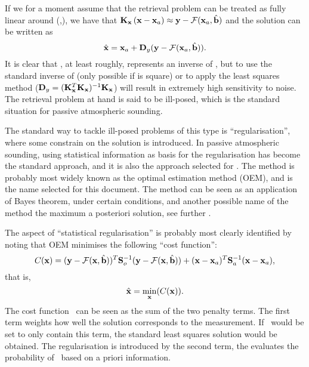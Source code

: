 If we for a moment assume that the retrieval problem can be treated as fully
linear around (,\FrwMdlVctHat), we
have that $\mathbf{K}_{\mathbf{x}}\left(\mathbf{x}-\mathbf{x}_{a}\right)\approx \mathbf{y}
-\mathcal{F}(\mathbf{x}_{a},\hat{\mathbf{b}})$ and the solution can be written as
\begin{equation}
  \label{eq:linretrieval}
  \hat{\mathbf{x}} = \mathbf{x}_{a} + \mathbf{D}_{y}(\mathbf{y}-\mathcal{F}(\mathbf{x}_{a},\hat{\mathbf{b}})).
\end{equation}
It is clear that \CtrFncMtr, at least roughly, represents an inverse of
\aWfnMtr{\SttVct}, but to use the standard inverse of \aWfnMtr{\SttVct} (only
possible if \aWfnMtr{\SttVct} is square) or to apply the least squares method
($\mathbf{D}_{y}=(\mathbf{K}_{\mathbf{x}}^T\mathbf{K}_{\mathbf{x}})^{-1}\mathbf{K}_{\mathbf{x}}$)
will result in extremely high sensitivity to noise. The retrieval problem at
hand is said to be ill-posed, which is the standard situation for passive
atmospheric sounding.

The standard way to tackle ill-posed problems of this type is
``regularisation'', where some constrain on the solution is introduced. In
passive atmospheric sounding, using statistical information as basis for the
regularisation has become the standard approach, and it is also the approach
selected for \smr. The method is probably most widely known as the optimal
estimation method (OEM), and is the name selected for this document. The method
can be seen as an application of Bayes theorem, under certain conditions, and
another possible name of the method the maximum a posteriori solution, see
further \citet{rodgers:00}.

The aspect of ``statistical regularisation'' is probably most clearly
identified by noting that OEM minimises the following ``cost function'':
\begin{equation}
  \label{eq:costfun}
  C(\mathbf{x}) = (\mathbf{y}-\mathcal{F}(\mathbf{x},\hat{\mathbf{b}}))^T\mathbf{S}_{o}^{-1}
  (\mathbf{y}-\mathcal{F}(\mathbf{x},\hat{\mathbf{b}})) +
  (\mathbf{x}-\mathbf{x}_{a})^T\mathbf{S}_{a}^{-1}(\mathbf{x}-\mathbf{x}_{a}),
\end{equation}
that is,
\begin{equation}
  \label{eq:mincost}
  \hat{\mathbf{x}} = \min\limits_{\mathbf{x}}(C(\mathbf{x})).
\end{equation}
The cost function \CstFnc\ can be seen as the sum of the two penalty terms. The
first term weights how well the solution corresponds to the measurement. If
\CstFnc\ would be set to only contain this term, the standard least squares
solution would be obtained. The regularisation is introduced by the second
term, the evaluates the probability of \SttVct\ based on a priori
information.

